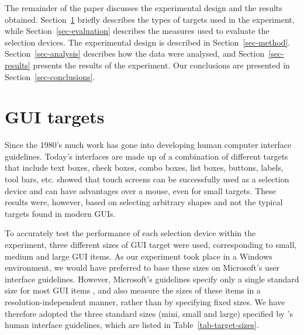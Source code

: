 \documentclass{elsart}
\begin{document}
The remainder of the paper discusses the experimental design and the
results obtained. Section~\ref{sec-GUI} briefly describes the types of
targets used in the experiment, while Section~\ref{sec-evaluation}
describes the measures used to evaluate the selection devices. The
experimental design is described in Section~\ref{sec-method}.
Section~\ref{sec-analysis} describes how the data were analysed, and
Section~\ref{sec-results} presents the results of the experiment. Our
conclusions are presented in Section~\ref{sec-conclusions}.


\section{GUI targets}
\label{sec-GUI}

Since the 1980's much work has gone into developing human computer
interface guidelines. Today's interfaces are made up of a combination of
different targets that include text boxes, check boxes, combo boxes,
list boxes, buttons, labels, tool bars, etc. \citet{Sear-A-1991-IJMMS}
showed that touch screens can be successfully used as a selection device
and can have advantages over a mouse, even for small targets. These
results were, however, based on selecting arbitrary shapes and not the
typical targets found in modern GUIs.

To accurately test the performance of each selection device within the
experiment, three different sizes of GUI target were used, corresponding
to small, medium and large GUI items. As our experiment took place in a
Windows environment, we would have preferred to base these sizes on
Microsoft's user interface guidelines. However, Microsoft's guidelines
specify only a single standard size for most GUI items \citep[pp.\
448--450]{MS-1999-UI}, and also measure the sizes of these items in a
resolution-independent manner, rather than by specifying fixed sizes. We
have therefore adopted the three standard sizes (mini, small and large)
specified by \citeauthor{Appl-2004-HIG}'s \citeyearpar{Appl-2004-HIG}
human interface guidelines, which are listed in
Table~\ref{tab-target-sizes}.
\end{document}
